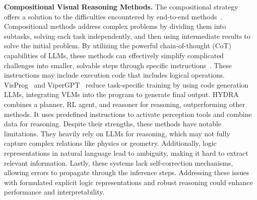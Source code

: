\noindent\textbf{Compositional Visual Reasoning Methods.}
The compositional strategy offers a solution to the difficulties encountered by end-to-end methods~\cite{suris_vipergpt_2023,you_idealgpt_2023,lu_chameleon_2023,gupta_visual_2023,stanic_towards_2024}. Compositional methods address complex problems by dividing them into subtasks, solving each task independently, and then using intermediate results to solve the initial problem. By utilizing the powerful chain-of-thought (CoT) capabilities of LLMs, these methods can effectively simplify complicated challenges into smaller, solvable steps through specific instructions~\cite{gupta_visual_2023,suris_vipergpt_2023}. These instructions may include execution code that includes logical operations. 
VisProg~\cite{gupta_visual_2023} and ViperGPT~\cite{suris_vipergpt_2023} reduce task-specific training by using code generation LLMs, integrating VLMs into the program to generate final output. HYDRA~\cite{ke_hydra_2024} combines a planner, RL agent, and reasoner for reasoning, outperforming other methods. It uses predefined instructions to activate perception tools and combine data for reasoning.
Despite their strengths, these methods have notable limitations. They heavily rely on LLMs for reasoning, which may not fully capture complex relations like physics or geometry. Additionally, logic representations in natural language lead to ambiguity, making it hard to extract relevant information. Lastly, these systems lack self-correction mechanisms, allowing errors to propagate through the inference steps. Addressing these issues with formulated explicit logic representations and robust reasoning could enhance performance and interpretability.
